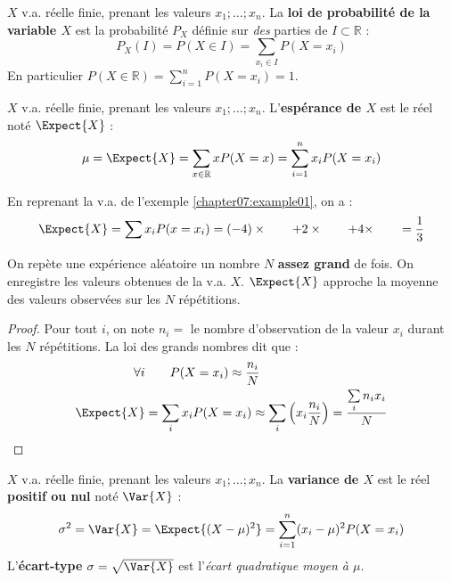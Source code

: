 \documentclass[main.tex]{subfiles}
\begin{document}
\begin{definition}[]  $X$ v.a. réelle finie, prenant les valeurs $x_1; \ldots ; x_n$. La \textbf{loi de probabilité de la variable $X$} est la   probabilité $P_X$ définie sur \emph{des} parties de $I\subset \mathbb{R}$ :  
	\setlength{\abovedisplayskip}{3pt}
	\setlength{\belowdisplayskip}{3pt}  
$$
P_X(I)=P(X\in I)=\sum_{x_i\in I} P(X=x_i)
$$ 
En particulier $P(X\in\mathbb{R})=\sum_{i=1}^n P(X=x_i)=1$.
\end{definition}
\begin{definition}  $X$ v.a. réelle finie, prenant les valeurs $x_1; \ldots ; x_n$. L'\textbf{espérance de $X$} est le réel noté $\Expect{X}$ :  
	\setlength{\abovedisplayskip}{3pt}
	\setlength{\belowdisplayskip}{3pt}  
	$$
	\mu = \Expect{X}=\sum_{x\in\mathbb{R}} xP(X=x) = \sum_{i=1}^{n} x_i P(X=x_i)
	$$ 
\end{definition}
\begin{example} En reprenant la v.a. de l'exemple \ref{chapter07:example01}, on a :
	\setlength{\abovedisplayskip}{3pt}
	\setlength{\belowdisplayskip}{3pt}  
	\[
	\Expect{X}=\sum x_iP(x=x_i)  = (-4)\times \qquad + 2\times \qquad + 4\times \qquad = \frac{1}{3}
	\]
\end{example}
\begin{remark}  On repète une expérience aléatoire un nombre $N$ \textbf{assez grand} de fois. On enregistre les valeurs obtenues de la v.a. $X$. 
$\Expect{X}$ approche la moyenne des valeurs observées sur les $N$ répétitions.
\end{remark}
\begin{proof} 	Pour tout $i$, on note $n_i=$ le nombre d'observation de la valeur $x_i$ durant les $N$ répétitions. La loi des grands nombres dit que :
	\setlength{\abovedisplayskip}{3pt}
	\setlength{\belowdisplayskip}{3pt}  
	\begin{align*}
		\forall i& \qquad   P(X=x_i)\approx \frac{n_i}{N}  \\ 
		\Expect{X}&=\sum_i x_iP(X=x_i)\approx \sum_i \left(x_i\frac{n_i}{N}\right) =\frac{ \sum\limits_i n_ix_i }{N}
	\end{align*}
\end{proof}
\begin{definition} $X$ v.a. réelle finie, prenant les valeurs $x_1; \ldots ; x_n$. La \textbf{variance de $X$} est le réel \textbf{positif ou nul} noté $\Var{X}$  :   
	\setlength{\abovedisplayskip}{3pt}
	\setlength{\belowdisplayskip}{3pt}  
	$$	
		\sigma^2 = \Var{X}   =\Expect{(X-\mu)^2}   =  \sum_{i=1}^{n} (x_i-\mu)^2 P(X=x_i)
	$$
	L'\textbf{écart-type} $\sigma=\sqrt{\Var{X}}$ est l'\emph{écart quadratique moyen à $\mu$}.
\end{definition}
\end{document}

